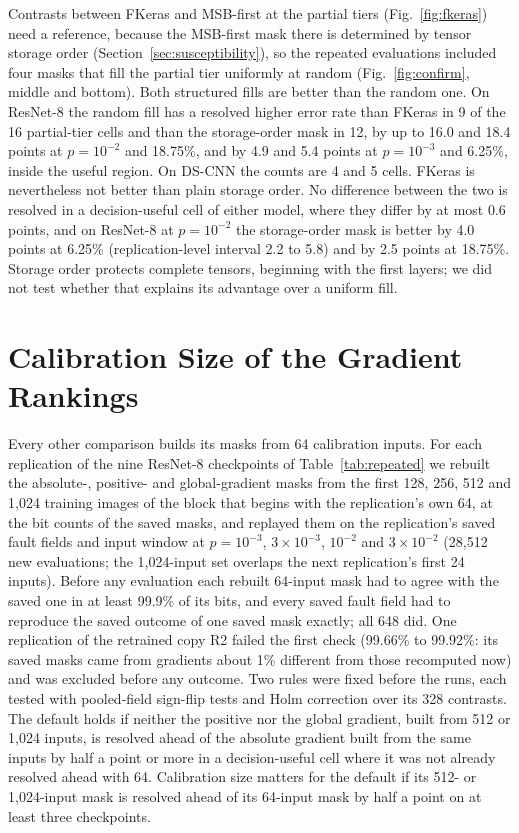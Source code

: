 Contrasts between FKeras and MSB-first at the partial tiers (Fig.~\ref{fig:fkeras}) need a reference, because the MSB-first mask there is determined by tensor storage order (Section~\ref{sec:susceptibility}), so the repeated evaluations included four masks that fill the partial tier uniformly at random (Fig.~\ref{fig:confirm}, middle and bottom). Both structured fills are better than the random one. On ResNet-8 the random fill has a resolved higher error rate than FKeras in 9 of the 16 partial-tier cells and than the storage-order mask in 12, by up to 16.0 and 18.4 points at $p=10^{-2}$ and 18.75\%, and by 4.9 and 5.4 points at $p=10^{-3}$ and 6.25\%, inside the useful region. On DS-CNN the counts are 4 and 5 cells. FKeras is nevertheless not better than plain storage order. No difference between the two is resolved in a decision-useful cell of either model, where they differ by at most 0.6 points, and on ResNet-8 at $p=10^{-2}$ the storage-order mask is better by 4.0 points at 6.25\% (replication-level interval 2.2 to 5.8) and by 2.5 points at 18.75\%. Storage order protects complete tensors, beginning with the first layers; we did not test whether that explains its advantage over a uniform fill.

\section{Calibration Size of the Gradient Rankings}\label{app:calibration}
Every other comparison builds its masks from 64 calibration inputs. For each replication of the nine ResNet-8 checkpoints of Table~\ref{tab:repeated} we rebuilt the absolute-, positive- and global-gradient masks from the first 128, 256, 512 and 1,024 training images of the block that begins with the replication's own 64, at the bit counts of the saved masks, and replayed them on the replication's saved fault fields and input window at $p=10^{-3}$, $3\times10^{-3}$, $10^{-2}$ and $3\times10^{-2}$ (28,512 new evaluations; the 1,024-input set overlaps the next replication's first 24 inputs). Before any evaluation each rebuilt 64-input mask had to agree with the saved one in at least 99.9\% of its bits, and every saved fault field had to reproduce the saved outcome of one saved mask exactly; all 648 did. One replication of the retrained copy R2 failed the first check (99.66\% to 99.92\%: its saved masks came from gradients about 1\% different from those recomputed now) and was excluded before any outcome. Two rules were fixed before the runs, each tested with pooled-field sign-flip tests and Holm correction over its 328 contrasts. The default holds if neither the positive nor the global gradient, built from 512 or 1,024 inputs, is resolved ahead of the absolute gradient built from the same inputs by half a point or more in a decision-useful cell where it was not already resolved ahead with 64. Calibration size matters for the default if its 512- or 1,024-input mask is resolved ahead of its 64-input mask by half a point on at least three checkpoints.

